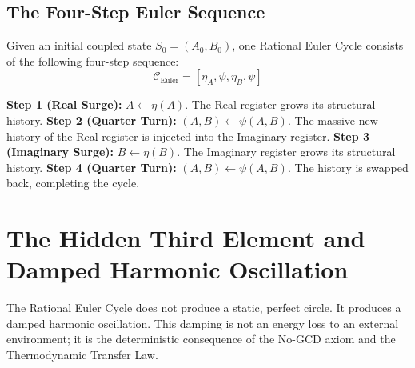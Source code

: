 \documentclass[11pt, letterpaper]{article}
\newcommand{\aop}{\eta}
\newcommand{\psiop}{\psi}
\begin{document}
\subsection{The Four-Step Euler Sequence}

\begin{theorem}\label{thm:euler_cycle}
\begin{rsbox}
Given an initial coupled state $S_0 = (A_0, B_0)$, one Rational Euler Cycle consists of the following four-step sequence:
\[ \mathcal{C}_{\text{Euler}} = [\aop_A, \psiop, \aop_B, \psiop] \]

\textbf{Step 1 (Real Surge):} $A \leftarrow \aop(A)$.
The Real register grows its structural history.
\textbf{Step 2 (Quarter Turn):} $(A, B) \leftarrow \psiop(A, B)$.
The massive new history of the Real register is injected into the Imaginary register.
\textbf{Step 3 (Imaginary Surge):} $B \leftarrow \aop(B)$.
The Imaginary register grows its structural history.
\textbf{Step 4 (Quarter Turn):} $(A, B) \leftarrow \psiop(A, B)$.
The history is swapped back, completing the cycle.
\end{rsbox}
\end{theorem}

\section{The Hidden Third Element and Damped Harmonic Oscillation}

The Rational Euler Cycle does not produce a static, perfect circle. It produces a damped harmonic oscillation. This damping is not an energy loss to an external environment; it is the deterministic consequence of the No-GCD axiom and the Thermodynamic Transfer Law.
\end{document}
